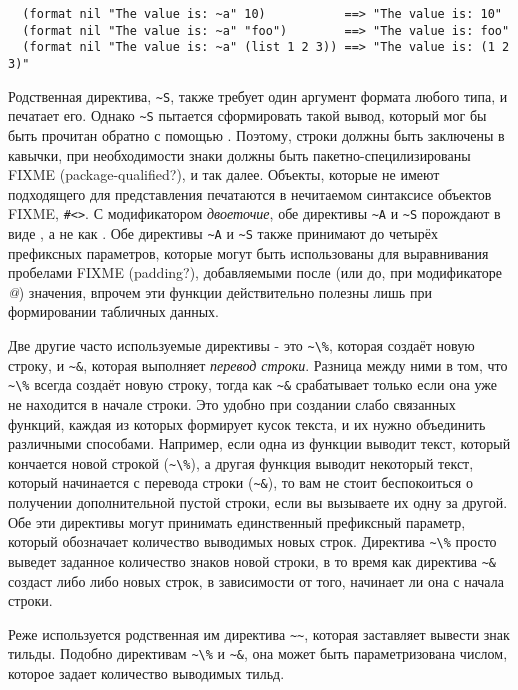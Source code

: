 {\begin{verbatim}
  (format nil "The value is: ~a" 10)           ==> "The value is: 10"
  (format nil "The value is: ~a" "foo")        ==> "The value is: foo"
  (format nil "The value is: ~a" (list 1 2 3)) ==> "The value is: (1 2 3)"
\end{verbatim}

Родственная директива, \lstinline!~S!, также требует один аргумент формата любого типа, и
печатает его. Однако \lstinline!~S!  пытается сформировать такой вывод, который мог бы
быть прочитан обратно с помощью . Поэтому, строки должны быть заключены в
кавычки, при необходимости знаки должны быть пакетно-специлизированы FIXME
(package-qualified?), и так далее. Объекты, которые не имеют подходящего для 
представления печатаются в нечитаемом синтаксисе объектов FIXME, \lstinline!#<>!. С
модификатором \textit{двоеточие}, обе директивы \lstinline!~A! и \lstinline!~S!  порождают
 в виде \code{()}, а не как . Обе директивы \lstinline!~A! и
\lstinline!~S! также принимают до четырёх префиксных параметров, которые могут быть
использованы для выравнивания пробелами FIXME (padding?), добавляемыми после (или до, при
модификаторе \textit{@}) значения, впрочем эти функции действительно полезны лишь при
формировании табличных данных.

Две другие часто используемые директивы - это \lstinline!~\%!, которая создаёт новую
строку, и \lstinline!~&!, которая выполняет \textit{перевод строки}. Разница между ними в
том, что \lstinline!~\%! всегда создаёт новую строку, тогда как \lstinline!~&!
срабатывает только если она уже не находится в начале строки. Это удобно при создании
слабо связанных функций, каждая из которых формирует кусок текста, и их нужно объединить
различными способами. Например, если одна из функции выводит текст, который кончается
новой строкой (\lstinline!~\%!), а другая функция выводит некоторый текст, который
начинается с перевода строки (\lstinline!~&!), то вам не стоит беспокоиться о получении
дополнительной пустой строки, если вы вызываете их одну за другой. Обе эти директивы могут
принимать единственный префиксный параметр, который обозначает количество выводимых новых
строк. Директива \lstinline!~\%! просто выведет заданное количество знаков новой строки, в
то время как директива \lstinline!~&! создаст либо  либо  новых строк,
в зависимости от того, начинает ли она с начала строки.

Реже используется родственная им директива \lstinline!~~!, которая заставляет
 вывести знак тильды. Подобно директивам \lstinline!~\%! и \lstinline!~&!,
она может быть параметризована числом, которое задает количество выводимых тильд.

}
